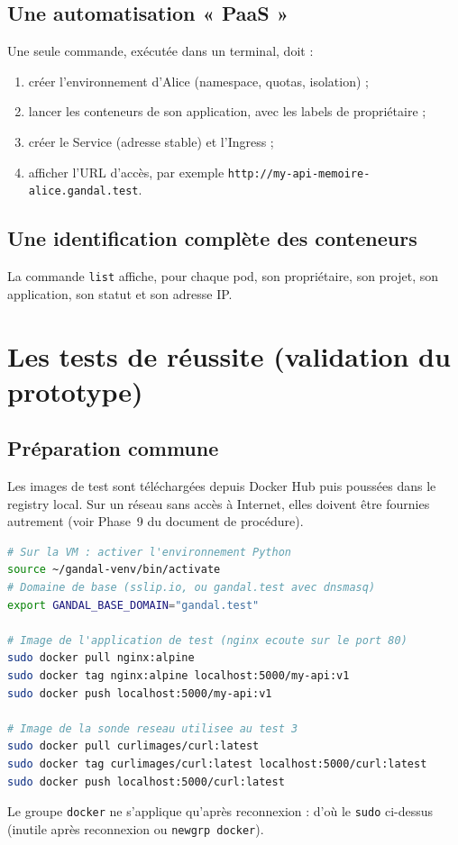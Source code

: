 \documentclass[12pt,a4paper]{article}
\begin{document}
\subsection{Une automatisation « PaaS »}
Une seule commande, exécutée dans un terminal, doit :
\begin{enumerate}
    \item créer l'environnement d'Alice (namespace, quotas, isolation) ;
    \item lancer les conteneurs de son application, avec les labels de propriétaire ;
    \item créer le Service (adresse stable) et l'Ingress ;
    \item afficher l'URL d'accès, par exemple \nolinkurl{http://my-api-memoire-alice.gandal.test}.
\end{enumerate}

\subsection{Une identification complète des conteneurs}
La commande \texttt{list} affiche, pour chaque pod, son propriétaire, son projet, son application, son statut et son adresse IP.

\section{Les tests de réussite (validation du prototype)}

\subsection{Préparation commune}
Les images de test sont téléchargées depuis Docker Hub puis poussées dans le registry local. Sur un réseau sans accès à Internet, elles doivent être fournies autrement (voir Phase~9 du document de procédure).

\begin{lstlisting}[language=bash]
# Sur la VM : activer l'environnement Python
source ~/gandal-venv/bin/activate
# Domaine de base (sslip.io, ou gandal.test avec dnsmasq)
export GANDAL_BASE_DOMAIN="gandal.test"

# Image de l'application de test (nginx ecoute sur le port 80)
sudo docker pull nginx:alpine
sudo docker tag nginx:alpine localhost:5000/my-api:v1
sudo docker push localhost:5000/my-api:v1

# Image de la sonde reseau utilisee au test 3
sudo docker pull curlimages/curl:latest
sudo docker tag curlimages/curl:latest localhost:5000/curl:latest
sudo docker push localhost:5000/curl:latest
\end{lstlisting}
Le groupe \texttt{docker} ne s'applique qu'après reconnexion : d'où le \texttt{sudo} ci-dessus (inutile après reconnexion ou \texttt{newgrp docker}).
\end{document}
